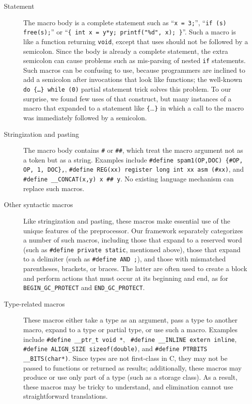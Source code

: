 \documentclass[11pt]{article}
\begin{document}
\begin{description}

\item[Statement]  The macro body is a complete statement such as
  ``{\tt x = 3;}'', ``{\tt if (s) free(s);}'' or ``{\tt \verb|{| int x =
    y*y; printf("\%d", x); \verb|}|}''.  Such a macro is like a function
    returning {\tt void}, except that uses should not be followed by a
    semicolon.  Since the body is already a complete statement, the extra
    semicolon can cause problems such as mis-parsing of nested {\tt if}
    statements.  Such macros can be confusing to use, because programmers
    are inclined to add a semicolon after invocations that look like
    functions; the well-known {\tt do \verb|{|\ldots\verb|}| while (0)}
    partial statement trick solves this problem.  To our surprise, we found
    few uses of that construct, but many instances of a macro that expanded
    to a statement like \verb|{|\ldots\verb|}| in which a call to the macro
    was immediately followed by a semicolon.

\item[Stringization and pasting]  The macro body contains {\tt \#} or
  {\tt \#\#}, which treat the macro argument not as a token but as a
  string.  Examples include {\tt \#define spam1(OP,DOC) \verb|{|\#OP, OP,
    1, DOC\verb|}|,}, {\tt \#define REG(xx) register long int xx asm
    (\#xx)}, and {\tt \#define \verb|__CONCAT|(x,y) x \#\# y}.  No existing
  language mechanism can replace such macros.

\item[Other syntactic macros]  Like stringization and pasting, these
  macros make essential use of the unique features of the preprocessor.
  Our framework separately categorizes a number of such macros, including
  those that expand to a reserved word (such as {\tt \#define private
  static}, mentioned above), those that expand to a delimiter (such as
{\tt \#define AND ;}), and those with mismatched parentheses, brackets, or
braces.  The latter are often used to create a block and perform actions
that must occur at its beginning and end, as for \verb|BEGIN_GC_PROTECT|
and \verb|END_GC_PROTECT|.

\item[Type-related macros]  These macros either take a type as an argument, pass
  a type to another macro, expand to a type or partial type, or use such a
  macro.  Examples include {\tt \#define \verb|__ptr_t| void *}, {\tt
  \#define \verb|__INLINE| extern inline}, {\tt \#define \verb|ALIGN_SIZE|
sizeof(double)}, and {\tt \#define PTRBITS \verb|__BITS|(char*)}.  Since
types are not first-class in C, they may not be passed to functions or
returned as results; additionally, these macros may produce or use only
part of a type (such as a storage class).  As a result, these macros may be
tricky to understand, and elimination cannot use straightforward
translations.


\end{description}
\end{document}
